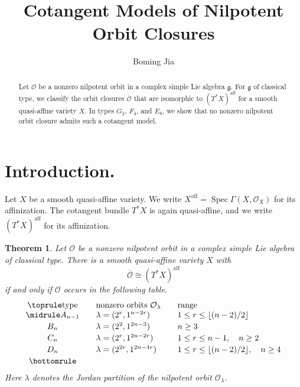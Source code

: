\documentclass[12pt]{article}
\title{Cotangent Models of Nilpotent Orbit Closures}
\author{Boming Jia}
\date{}
\newtheorem{theorem}{Theorem}[section]
\theoremstyle{remark}
\theoremstyle{plain}
\DeclareMathOperator{\Spec}{Spec}
\newcommand{\OO}{\mathcal O}
\newcommand{\aff}{\mathrm{aff}}
\begin{document}
\setlength{\droptitle}{-6em}
\maketitle
\vspace{-3em}

\begin{abstract}
Let $\mathcal O$ be a nonzero nilpotent orbit in a complex simple Lie
algebra $\mathfrak g$.
For $\mathfrak g$ of classical type, we classify the orbit closures
$\overline{\mathcal O}$ that are isomorphic to
$(T^*X)^{\mathrm{aff}}$ for a smooth quasi-affine variety $X$.
In types $G_2$, $F_4$, and $E_8$, we show that no nonzero nilpotent
orbit closure admits such a cotangent model.
\end{abstract}

\section{Introduction.}\label{sec:introduction}

Let $X$ be a smooth quasi-affine variety.
We write $X^{\aff}=\Spec\Gamma(X,\mathcal O_X)$ for its affinization.
The cotangent bundle $T^*X$ is again quasi-affine, and we write
$(T^*X)^{\aff}$ for its affinization.

\begin{theorem}\label{thm:classification}
Let $\mathcal O$ be a nonzero nilpotent orbit in a complex simple Lie
algebra of classical type.
There is a smooth quasi-affine variety $X$ with
\[
\overline{\mathcal O}\cong(T^*X)^{\aff}
\]
if and only if $\mathcal O$ occurs in the following table.
\[
\begin{array}{c@{\qquad}l@{\qquad}l}
\toprule
\text{type}&\text{nonzero orbits } \OO_\lambda&\text{range}\\
\midrule
A_{n-1}&\lambda=(2^r,1^{n-2r})
&1\leq r\leq\lfloor(n-2)/2\rfloor\\[2pt]
B_n&\lambda=(2^2,1^{2n-3})
&n\geq3\\[2pt]
C_n&\lambda=(2^r,1^{2n-2r})
&1\leq r\leq n-1,\quad n\geq2\\[2pt]
D_n&\lambda=(2^{2r},1^{2n-4r})
&1\leq r\leq\lfloor(n-2)/2\rfloor,\quad n\geq4\\[2pt]
\bottomrule
\end{array}
\]
Here $\lambda$ denotes the Jordan partition of the nilpotent orbit
$\OO_\lambda$.
\end{theorem}
\end{document}
